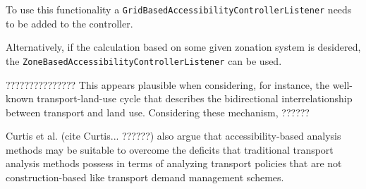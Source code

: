 

To use this functionality a \texttt{GridBasedAccessibilityControllerListener} needs to be added to the controller.

Alternatively, if the calculation based on some given zonation system is desidered, the \texttt{ZoneBasedAccessibilityControllerListener} can be used.





???????????????
This appears plausible when considering, for instance, the well-known transport-land-use cycle that describes the 
bidirectional interrelationship between transport and land use. Considering these mechanism, ?????? 

Curtis et al. (cite Curtis... ??????) also argue that accessibility-based analysis methods may be suitable to overcome 
the deficits that traditional transport analysis methods possess in terms of analyzing transport policies that are not 
construction-based like transport demand management schemes.

%
%
%
%
%

